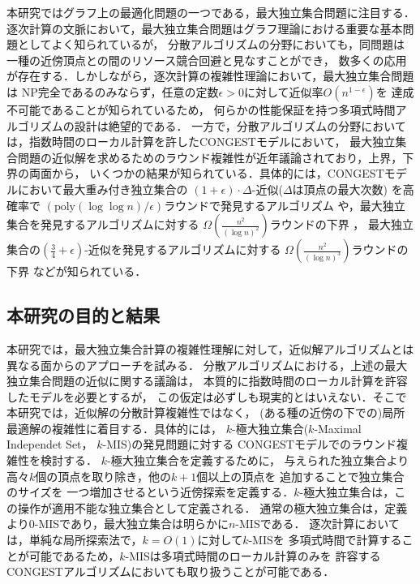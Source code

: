 \documentclass[11pt,a4paper]{jarticle}
\newcommand{\CONGEST}{\textsf{CONGEST}}
\theoremstyle{definition}
\begin{document}
本研究ではグラフ上の最適化問題の一つである，最大独立集合問題に注目する．
逐次計算の文脈において，最大独立集合問題はグラフ理論における重要な基本問題としてよく知られているが，
分散アルゴリズムの分野においても，同問題は一種の近傍頂点との間のリソース競合回避と見なすことができ，
数多くの応用が存在する．しかしながら，逐次計算の複雑性理論において，最大独立集合問題は
NP完全であるのみならず，任意の定数$\epsilon > 0$に対して近似率$O(n^{1-\epsilon})$を
達成不可能であることが知られているため，
何らかの性能保証を持つ多項式時間アルゴリズムの設計は絶望的である\cite{haastad1999clique}．
一方で，分散アルゴリズムの分野においては，指数時間のローカル計算を許した{\CONGEST}モデルにおいて，
最大独立集合問題の近似解を求めるためのラウンド複雑性が近年議論されており，上界，下界の両面から，
いくつかの結果が知られている．具体的には，{\CONGEST}モデルにおいて最大重み付き独立集合の
$(1 + \epsilon) \cdot \Delta$-近似($\Delta$は頂点の最大次数) を高確率で
$\left(\mathrm{poly}(\log \log n)/\epsilon \right)$ラウンドで発見するアルゴリズム
\cite{kawarabayashi2019improved} や，最大独立集合を発見するアルゴリズムに対する
$\Omega \left(\frac{n^{2}}{(\log n)^{2}}\right)$ラウンドの下界 \cite{censor2017quadratic}，
最大独立集合の$(\frac{3}{4} + \epsilon)$-近似を発見するアルゴリズムに対する
$\Omega \left(\frac{n^{2}}{(\log n)^{3}}\right)$ラウンドの下界 \cite{efron2020beyond} などが知られている．

\subsection{本研究の目的と結果}
本研究では，最大独立集合計算の複雑性理解に対して，近似解アルゴリズムとは異なる面からのアプローチを試みる．
分散アルゴリズムにおける，上述の最大独立集合問題の近似に関する議論は，
本質的に指数時間のローカル計算を許容したモデルを必要とするが，
この仮定は必ずしも現実的とはいえない．そこで本研究では，近似解の分散計算複雑性ではなく，
(ある種の近傍の下での)局所最適解の複雑性に着目する．具体的には，
$k$-極大独立集合($k$-Maximal Independet Set， $k$-MIS)の発見問題に対する
{\CONGEST}モデルでのラウンド複雑性を検討する\cite{bollobas1991generalised}．
$k$-極大独立集合を定義するために，
与えられた独立集合より高々$k$個の頂点を取り除き，他の$k+1$個以上の頂点を
追加することで独立集合のサイズを
一つ増加させるという近傍探索を定義する．$k$-極大独立集合は，この操作が適用不能な独立集合として定義される．
通常の極大独立集合は，定義より$0$-MISであり，最大独立集合は明らかに$n$-MISである．
逐次計算においては，単純な局所探索法で，$k=O(1)$に対して$k$-MISを
多項式時間で計算することが可能であるため，$k$-MISは多項式時間のローカル計算のみを
許容する{\CONGEST}アルゴリズムにおいても取り扱うことが可能である．
\end{document}
